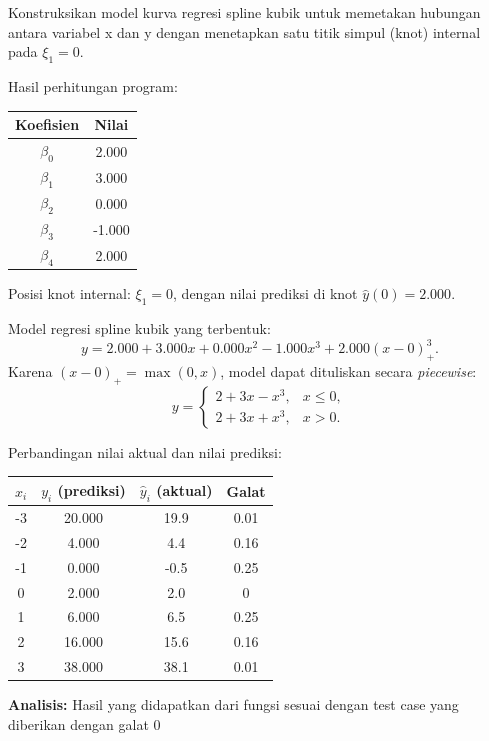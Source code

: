 \documentclass[12pt,a4paper]{report}
\begin{document}
Konstruksikan model kurva regresi spline kubik untuk memetakan hubungan antara variabel x dan
y dengan menetapkan satu titik simpul (knot) internal pada $\xi_1 = 0$.



Hasil perhitungan program:

\begin{center}
\begin{tabular}{|c|c|}
\hline
Koefisien & Nilai \\
\hline
$\beta_0$ & 2.000 \\
$\beta_1$ & 3.000 \\
$\beta_2$ & 0.000 \\
$\beta_3$ & -1.000 \\
$\beta_4$ & 2.000 \\
\hline
\end{tabular}
\end{center}

Posisi knot internal: $\xi_1 = 0$, dengan nilai prediksi di knot
$\hat{y}(0) = 2.000$.

Model regresi spline kubik yang terbentuk:
\[
y = 2.000 + 3.000x + 0.000x^2 - 1.000x^3 + 2.000(x-0)_+^3.
\]
Karena $(x-0)_+ = \max(0,x)$, model dapat dituliskan secara \emph{piecewise}:
\[
y =
\begin{cases}
2 + 3x - x^3, & x \le 0,\\[4pt]
2 + 3x + x^3, & x > 0.
\end{cases}
\]

Perbandingan nilai aktual dan nilai prediksi:

\begin{center}
\begin{tabular}{|c|c|c|c|}
\hline
$x_i$ & $y_i$ (prediksi) & $\hat{y}_i$ (aktual) & Galat \\
\hline
-3 & 20.000 & 19.9 & 0.01 \\
-2 &  4.000 &  4.4 & 0.16 \\
-1 & 0.000 &  -0.5 & 0.25 \\
 0 &  2.000 &  2.0 & 0 \\
 1 &  6.000 &  6.5 & 0.25 \\
 2 & 16.000 & 15.6 & 0.16 \\
 3 & 38.000 & 38.1 & 0.01 \\
\hline
\end{tabular}
\end{center}

\textbf{Analisis:} Hasil yang didapatkan dari fungsi sesuai dengan test case yang diberikan dengan galat 0
\end{document}
